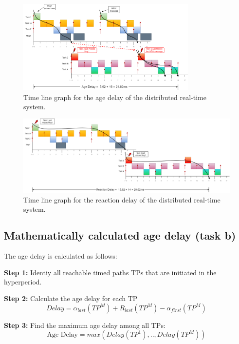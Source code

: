         \begin{figure}[H]
            \centering
            \includegraphics[width=0.8\textwidth]{images/AgeDelay.png}
            \caption{Time line graph for the age delay of the distributed real-time system.}
            \label{fig:agedelay}   
        \end{figure}

        \begin{figure}[H]
            \centering
            \includegraphics[width=1\textwidth]{images/ReactionDelay.png}
            \caption{Time line graph for the reaction delay of the distributed real-time system.}
            \label{fig:reactiondelay}
        \end{figure}


        \subsection*{\textbf{Mathematically calculated age delay (task b)}}
            The age delay is calculated as follows:

            \textbf{Step 1:} Identiy all reachable timed paths TPs that are initiated in the hyperperiod. 

            \textbf{Step 2:} Calculate the age delay for each TP
            $$Delay = \alpha_{last}(TP^M) + R_{last}(TP^M) - \alpha_{first}(TP^M)$$

            \textbf{Step 3:} Find the maximum age delay among all TPs: 
            $$\text{Age Delay} = max(Delay(TP^1),..,Delay(TP^M))$$


